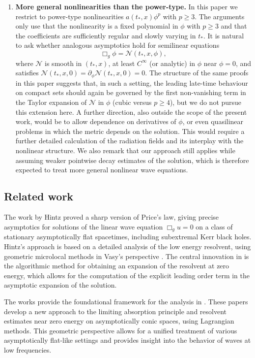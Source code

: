 \documentclass[10pt,a4paper,reqno]{amsart}
\theoremstyle{definition}
\theoremstyle{remark}
\numberwithin{equation}{section}
\begin{document}
\begin{enumerate}
  \item \textbf{More general nonlinearities than the power-type.} In this paper we restrict to power-type nonlinearities $a(t_*,x)\phi^p$ with $p\ge 3$. The arguments only use that the nonlinearity is a fixed polynomial in $\phi$ with $p\ge 3$ and that the coefficients are sufficiently regular and slowly varying in $t_*$. It is natural to ask whether analogous asymptotics hold for semilinear equations
  \[
    \Box_g\phi = \mathcal N(t_*,x,\phi),
  \]
  where $\mathcal N$ is smooth in $(t_*,x)$, at least $C^\infty$ (or analytic) in $\phi$ near $\phi=0$, and satisfies $\mathcal N(t_*,x,0)=\partial_\phi\mathcal N(t_*,x,0)=0$. The structure of the same proofs in this paper suggests that, in such a setting, the leading late-time behaviour on compact sets should again be governed by the first non-vanishing term in the Taylor expansion of $\mathcal N$ in $\phi$ (cubic versus $p\ge 4$), but we do not pursue this extension here. A further direction, also outside the scope of the present work, would be to allow dependence on derivatives of $\phi$, or even quasilinear problems in which the metric depends on the solution. This would require a further detailed calculation of the radiation fields and its interplay with the nonlinear structure. We also remark that our approach still applies while assuming weaker pointwise decay estimates of the solution, which is therefore expected to treat more general nonlinear wave equations. 
\end{enumerate}

\subsection{Related work}
The work \cite{Hin22} by Hintz proved a sharp version of Price's law, giving precise asymptotics for solutions of the linear wave equation $\Box_g u = 0$ on a class of stationary asymptotically flat spacetimes, including subextremal Kerr black holes. Hintz's approach is based on a detailed analysis of the low energy resolvent, using geometric microlocal methods in Vasy's perspective \cite{VasyLAPLag,VasyLowEnergyLag}. The central innovation in \cite{Hin22} is the algorithmic method for obtaining an expansion of the resolvent at zero energy, which allows for the computation of the explicit leading order term in the asymptotic expansion of the solution.

The works \cite{VasyLAPLag, VasyLowEnergyLag} provide the foundational framework for the analysis in \cite{Hin22}. These papers develop a new approach to the limiting absorption principle and resolvent estimates near zero energy on asymptotically conic spaces, using Lagrangian methods. This geometric perspective allows for a unified treatment of various asymptotically flat-like settings and provides insight into the behavior of waves at low frequencies.
\end{document}
